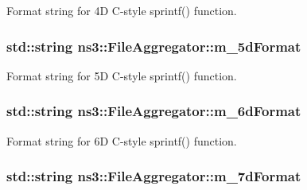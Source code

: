 Format string for 4D C-\/style sprintf() function. 

\subsubsection[{\texorpdfstring{m\+\_\+5d\+Format}{m_5dFormat}}]{\setlength{\rightskip}{0pt plus 5cm}std\+::string ns3\+::\+File\+Aggregator\+::m\+\_\+5d\+Format\hspace{0.3cm}{\ttfamily [private]}}\hypertarget{classns3_1_1FileAggregator_a247f50a47e562ed81cb794e4615796f7}{}\label{classns3_1_1FileAggregator_a247f50a47e562ed81cb794e4615796f7}


Format string for 5D C-\/style sprintf() function. 

\subsubsection[{\texorpdfstring{m\+\_\+6d\+Format}{m_6dFormat}}]{\setlength{\rightskip}{0pt plus 5cm}std\+::string ns3\+::\+File\+Aggregator\+::m\+\_\+6d\+Format\hspace{0.3cm}{\ttfamily [private]}}\hypertarget{classns3_1_1FileAggregator_ad3cbb0a4fc2b0ec4499bcae467f3a2b8}{}\label{classns3_1_1FileAggregator_ad3cbb0a4fc2b0ec4499bcae467f3a2b8}


Format string for 6D C-\/style sprintf() function. 

\subsubsection[{\texorpdfstring{m\+\_\+7d\+Format}{m_7dFormat}}]{\setlength{\rightskip}{0pt plus 5cm}std\+::string ns3\+::\+File\+Aggregator\+::m\+\_\+7d\+Format\hspace{0.3cm}{\ttfamily [private]}}\hypertarget{classns3_1_1FileAggregator_a99d97fdbd128467b17b8b737c64ad50a}{}\label{classns3_1_1FileAggregator_a99d97fdbd128467b17b8b737c64ad50a}


